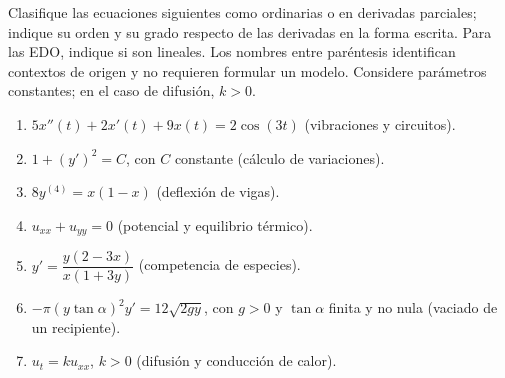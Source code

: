 Clasifique las ecuaciones siguientes como ordinarias o en derivadas parciales; indique su orden y su grado respecto de las derivadas en la forma escrita. Para las EDO, indique si son lineales. Los nombres entre paréntesis identifican contextos de origen y no requieren formular un modelo. Considere parámetros constantes; en el caso de difusión, $k>0$.

\begin{enumerate}[label=(\alph*),ref=\alph*,leftmargin=*]
\item $5x''(t)+2x'(t)+9x(t)=2\cos(3t)$ (vibraciones y circuitos).
\item $1+(y')^2=C$, con $C$ constante (cálculo de variaciones).
\item $8y^{(4)}=x(1-x)$ (deflexión de vigas).
\item $u_{xx}+u_{yy}=0$ (potencial y equilibrio térmico).
\item $y'=\dfrac{y(2-3x)}{x(1+3y)}$ (competencia de especies).
\item $-\pi(y\tan\alpha)^2y'=12\sqrt{2gy}$, con $g>0$ y $\tan\alpha$ finita y no nula (vaciado de un recipiente).
\item $u_t=k u_{xx}$, $k>0$ (difusión y conducción de calor).
\end{enumerate}
